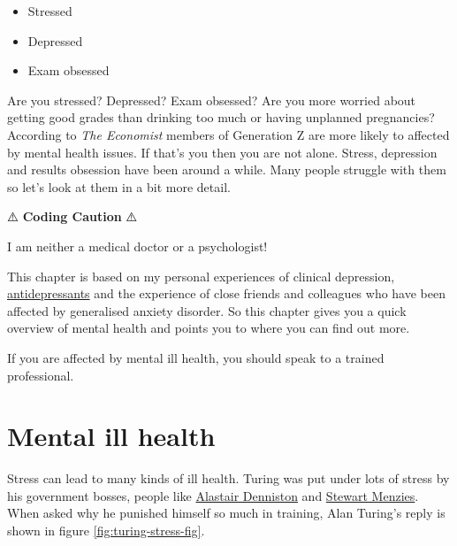 \documentclass[
]{book}
\providecommand{\tightlist}{%
  \setlength{\itemsep}{0pt}\setlength{\parskip}{0pt}}
\begin{document}
\begin{itemize}
\tightlist
\item
  Stressed
\item
  Depressed
\item
  Exam obsessed
\end{itemize}

Are you stressed? Depressed? Exam obsessed? Are you more worried about getting good grades than drinking too much or having unplanned pregnancies? According to \emph{The Economist} members of Generation Z are more likely to affected by mental health issues. \citep{generationz} If that's you then you are not alone. Stress, depression and results obsession have been around a while. Many people struggle with them so let's look at them in a bit more detail.

⚠️ \textbf{Coding Caution} ⚠️

I am neither a medical doctor or a psychologist!

This chapter is based on my personal experiences of clinical depression, \href{https://en.wikipedia.org/wiki/Antidepressant}{antidepressants} and the experience of close friends and colleagues who have been affected by generalised anxiety disorder. So this chapter gives you a quick overview of mental health and points you to where you can find out more.

If you are affected by mental ill health, you should speak to a trained professional.

\hypertarget{illhealth}{%
\section{Mental ill health}\label{illhealth}}

Stress can lead to many kinds of ill health. Turing was put under lots of stress by his government bosses, people like \href{https://en.wikipedia.org/wiki/Alastair_Denniston}{Alastair Denniston} and \href{https://en.wikipedia.org/wiki/Stewart_Menzies}{Stewart Menzies}. \citep{imitationgame} When asked why he punished himself so much in training, Alan Turing's reply is shown in figure \ref{fig:turing-stress-fig}.
\end{document}
